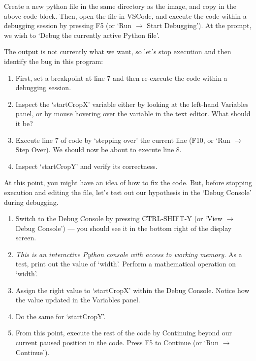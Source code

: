 \documentclass[11pt]{article}
\begin{document}
\begin{tcolorbox}[colback=orange!5!white,colframe=orange!75!black,enhanced jigsaw,breakable,pad at break*=1mm]
Create a new python file in the same directory as the image, and copy in the above code block. Then, open the file in VSCode, and execute the code within a debugging session by pressing F5 (or `Run $\rightarrow$ Start Debugging'). At the prompt, we wish to `Debug the currently active Python file'.

The output is not currently what we want, so let's stop execution and then identify the bug in this program:
\begin{enumerate}
    \item First, set a breakpoint at line 7 and then re-execute the code within a debugging session.
    \item Inspect the `startCropX' variable either by looking at the left-hand Variables panel, or by mouse hovering over the variable in the text editor. What should it be?
    \item Execute line 7 of code by `stepping over' the current line (F10, or `Run $\rightarrow$ Step Over). We should now be about to execute line 8.
    \item Inspect `startCropY' and verify its correctness.
\end{enumerate}

At this point, you might have an idea of how to fix the code. But, before stopping execution and editing the file, let's test out our hypothesis in the `Debug Console' during debugging.

\begin{enumerate}
    \item Switch to the Debug Console by pressing CTRL-SHIFT-Y (or `View $\rightarrow$ Debug Console') --- you should see it in the bottom right of the display screen.
    \item \emph{This is an interactive Python console with access to working memory.} As a test, print out the value of `width'. Perform a mathematical operation on `width'.
    \item Assign the right value to `startCropX' within the Debug Console. Notice how the value updated in the Variables panel.
    \item Do the same for `startCropY'.
    \item From this point, execute the rest of the code by Continuing beyond our current paused position in the code. Press F5 to Continue (or `Run $\rightarrow$ Continue').
\end{enumerate}

\end{tcolorbox}
\end{document}

